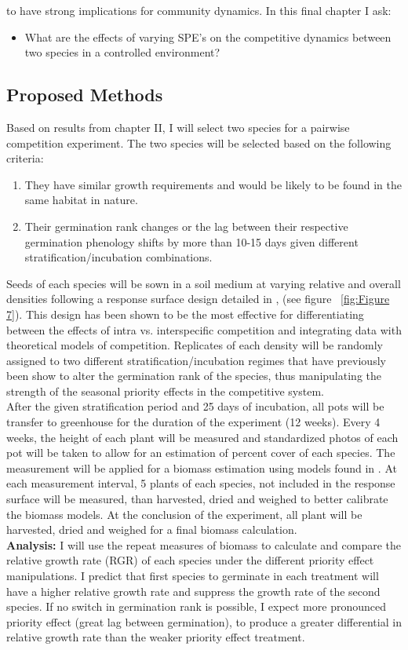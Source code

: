 \documentclass{article}\usepackage[]{graphicx}\usepackage[]{color}
\begin{document}
to have strong implications for community dynamics. In this final chapter I ask:
\begin{itemize}
\item What are the effects of varying SPE's on the competitive dynamics between two species in a controlled environment?
\end{itemize}
\subsection*{Proposed Methods}
\indent\indent Based on results from chapter II, I will select two species for a pairwise competition experiment. The two species will be selected based on the following criteria:
\begin{enumerate}
\item They have similar growth requirements and would be likely to be found in the same habitat in nature.
\item Their germination rank changes or the lag between their respective germination phenology shifts by more than 10-15 days given different stratification/incubation combinations.
\end{enumerate}
\indent\indent Seeds of each species will be sown in a soil medium at varying relative and overall densities following a response surface design detailed in \cite{Inouye2001}, (see figure ~\ref{fig:Figure 7}). This design has been shown to be the most effective for differentiating between the effects of intra vs. interspecific competition and integrating data with theoretical models of competition.  Replicates of each density will be randomly assigned to two different stratification/incubation regimes that have previously been show to alter the germination rank of the species, thus manipulating the strength of the seasonal priority effects in the competitive system.\\
\indent After the given stratification period and 25 days of incubation, all pots will be transfer to greenhouse for the duration of the experiment (12 weeks). Every 4 weeks, the height of each plant will be measured and standardized photos of each pot will be taken to allow for an estimation of percent cover of each species. The measurement will be applied for a biomass estimation using models found in \citet{Axmanova2012}. At each measurement interval, 5 plants of each species, not included in the response surface will be measured, than harvested, dried and weighed to better calibrate the biomass models. At the conclusion of the experiment, all plant will be harvested, dried and weighed for a final biomass calculation.\\
\indent\textbf{Analysis:} I will use the repeat measures of biomass to calculate and compare the relative growth rate (RGR) \citep{Connolly2005} of each species under the different priority effect manipulations. I predict that first species to germinate in each treatment will have a higher relative growth rate and suppress the growth rate of the second species. If no switch in germination rank is possible, I expect more pronounced priority effect (great lag between germination), to produce a greater differential in relative growth rate than the weaker priority effect treatment.\\  
\end{document}
